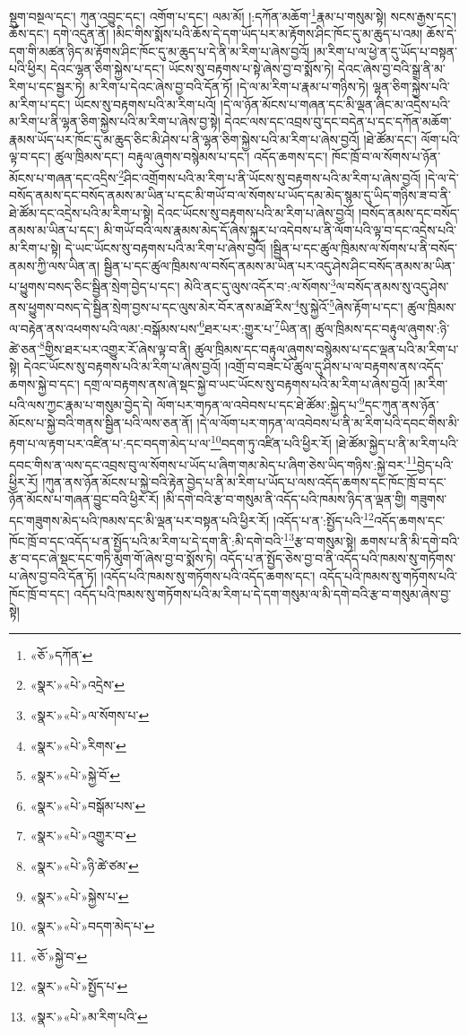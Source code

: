 སྡུག་བསྔལ་དང་། ཀུན་འབྱུང་དང་། འགོག་པ་དང་། ལམ་མོ། །:དཀོན་མཆོག་\footnote{«ཅོ་»དཀོན་}རྣམ་པ་གསུམ་སྟེ། སངས་རྒྱས་དང་། ཆོས་དང་། དགེ་འདུན་ནོ། །མིང་གིས་སྨོས་པའི་ཆོས་དེ་དག་ཡོད་པར་མ་རྟོགས་ཤིང་ཁོང་དུ་མ་ཆུད་པ་འམ། ཆོས་དེ་དག་གི་མཚན་ཉིད་མ་རྟོགས་ཤིང་ཁོང་དུ་མ་ཆུད་པ་དེ་ནི་མ་རིག་པ་ཞེས་བྱའོ། །མ་རིག་པ་ལ་ཕྱེ་ན་དུ་ཡོད་པ་བསྟན་པའི་ཕྱིར། དེའང་ལྷན་ཅིག་སྐྱེས་པ་དང་། ཡོངས་སུ་བརྟགས་པ་སྟེ་ཞེས་བྱ་བ་སྨོས་ཏེ། དེའང་ཞེས་བྱ་བའི་སྒྲ་ནི་མ་རིག་པ་དང་སྦྱར་ཏེ། མ་རིག་པ་དེའང་ཞེས་བྱ་བའི་དོན་ཏོ། །དེ་ལ་མ་རིག་པ་རྣམ་པ་གཉིས་ཏེ། ལྷན་ཅིག་སྐྱེས་པའི་མ་རིག་པ་དང་། ཡོངས་སུ་བརྟགས་པའི་མ་རིག་པའོ། །དེ་ལ་ཉོན་མོངས་པ་གཞན་དང་མི་ལྡན་ཞིང་མ་འདྲེས་པའི་མ་རིག་པ་ནི་ལྷན་ཅིག་སྐྱེས་པའི་མ་རིག་པ་ཞེས་བྱ་སྟེ། དེའང་ལས་དང་འབྲས་བུ་དང་བདེན་པ་དང་དཀོན་མཆོག་རྣམས་ཡོད་པར་ཁོང་དུ་མ་ཆུད་ཅིང་མི་ཤེས་པ་ནི་ལྷན་ཅིག་སྐྱེས་པའི་མ་རིག་པ་ཞེས་བྱའོ། །ཐེ་ཚོམ་དང་། ལོག་པའི་ལྟ་བ་དང་། ཚུལ་ཁྲིམས་དང་། བརྟུལ་ཞུགས་བསྙེམས་པ་དང་། འདོད་ཆགས་དང་། ཁོང་ཁྲོ་བ་ལ་སོགས་པ་ཉོན་མོངས་པ་གཞན་དང་འདྲིས་\footnote{«སྣར་»«པེ་»འདྲེས་}ཤིང་འགྲོགས་པའི་མ་རིག་པ་ནི་ཡོངས་སུ་བརྟགས་པའི་མ་རིག་པ་ཞེས་བྱའོ། །དེ་ལ་དེ་བསོད་ནམས་དང་བསོད་ནམས་མ་ཡིན་པ་དང་མི་གཡོ་བ་ལ་སོགས་པ་ཡོད་དམ་མེད་སྙམ་དུ་ཡིད་གཉིས་ཟ་བ་ནི་ཐེ་ཚོམ་དང་འདྲེས་པའི་མ་རིག་པ་སྟེ། དེའང་ཡོངས་སུ་བརྟགས་པའི་མ་རིག་པ་ཞེས་བྱའོ། །བསོད་ནམས་དང་བསོད་ནམས་མ་ཡིན་པ་དང་། མི་གཡོ་བའི་ལས་རྣམས་མེད་དོ་ཞེས་སྐུར་པ་འདེབས་པ་ནི་ལོག་པའི་ལྟ་བ་དང་འདྲེས་པའི་མ་རིག་པ་སྟེ། དེ་ཡང་ཡོངས་སུ་བརྟགས་པའི་མ་རིག་པ་ཞེས་བྱའོ། །སྦྱིན་པ་དང་ཚུལ་ཁྲིམས་ལ་སོགས་པ་ནི་བསོད་ནམས་ཀྱི་ལས་ཡིན་ན། སྦྱིན་པ་དང་ཚུལ་ཁྲིམས་ལ་བསོད་ནམས་མ་ཡིན་པར་འདུ་ཤེས་ཤིང་བསོད་ནམས་མ་ཡིན་པ་ཕྱུགས་བསད་ཅིང་སྦྱིན་སྲེག་བྱེད་པ་དང་། མེའི་ནང་དུ་ལུས་འདོར་བ་:ལ་སོགས་\footnote{«སྣར་»«པེ་»ལ་སོགས་པ་}ལ་བསོད་ནམས་སུ་འདུ་ཤེས་ནས་ཕྱུགས་བསད་དེ་སྦྱིན་སྲེག་བྱས་པ་དང་ལུས་མེར་བོར་ནས་མཐོ་རིས་\footnote{«སྣར་»«པེ་»རིགས་}སུ་སྐྱེའོ་\footnote{«སྣར་»«པེ་»སྐྱེ་བོ་}ཞེས་རྟོག་པ་དང་། ཚུལ་ཁྲིམས་ལ་བརྟེན་ནས་འཕགས་པའི་ལམ་:བསྒོམས་པས་\footnote{«སྣར་»«པེ་»བསྒོམ་པས་}ཐར་པར་:གྱུར་པ་\footnote{«སྣར་»«པེ་»འགྱུར་བ་}ཡིན་ན། ཚུལ་ཁྲིམས་དང་བརྟུལ་ཞུགས་:ཉི་ཚེ་ཅན་\footnote{«སྣར་»«པེ་»ཉི་ཚེ་ཙམ་}གྱིས་ཐར་པར་འགྱུར་རོ་ཞེས་ལྟ་བ་ནི། ཚུལ་ཁྲིམས་དང་བརྟུལ་ཞུགས་བསྙེམས་པ་དང་ལྡན་པའི་མ་རིག་པ་སྟེ། དེའང་ཡོངས་སུ་བརྟགས་པའི་མ་རིག་པ་ཞེས་བྱའོ། །འགྲོ་བ་བཟང་པོ་ཚུལ་དུ་ཤིས་པ་ལ་བརྟགས་ནས་འདོད་ཆགས་སྐྱེ་བ་དང་། དགྲ་ལ་བརྟགས་ནས་ཞེ་སྡང་སྐྱེ་བ་ཡང་ཡོངས་སུ་བརྟགས་པའི་མ་རིག་པ་ཞེས་བྱའོ། །མ་རིག་པའི་ལས་ཀྱང་རྣམ་པ་གསུམ་བྱེད་དེ། ལོག་པར་གཏན་ལ་འབེབས་པ་དང་ཐེ་ཚོམ་:སྐྱེད་པ་\footnote{«སྣར་»«པེ་»སྐྱེས་པ་}དང་ཀུན་ནས་ཉོན་མོངས་པ་སྐྱེ་བའི་གནས་སྦྱིན་པའི་ལས་ཅན་ནོ། །དེ་ལ་ལོག་པར་གཏན་ལ་འབེབས་པ་ནི་མ་རིག་པའི་དབང་གིས་མི་རྟག་པ་ལ་རྟག་པར་འཛིན་པ་:དང་བདག་མེད་པ་ལ་\footnote{«སྣར་»«པེ་»བདག་མེད་པ་}བདག་ཏུ་འཛིན་པའི་ཕྱིར་རོ། །ཐེ་ཚོམ་སྐྱེད་པ་ནི་མ་རིག་པའི་དབང་གིས་ན་ལས་དང་འབྲས་བུ་ལ་སོགས་པ་ཡོད་པ་ཞིག་གམ་མེད་པ་ཞིག་ཅེས་ཡིད་གཉིས་:སྐྱེ་བར་\footnote{«ཅོ་»སྐྱེ་བ་}བྱེད་པའི་ཕྱིར་རོ། །ཀུན་ནས་ཉོན་མོངས་པ་སྐྱེ་བའི་རྟེན་བྱེད་པ་ནི་མ་རིག་པ་ཡོད་པ་ལས་འདོད་ཆགས་དང་ཁོང་ཁྲོ་བ་དང་ཉོན་མོངས་པ་གཞན་བྱུང་བའི་ཕྱིར་རོ། །མི་དགེ་བའི་རྩ་བ་གསུམ་ནི་འདོད་པའི་ཁམས་ཉིད་ན་ལྡན་གྱི། གཟུགས་དང་གཟུགས་མེད་པའི་ཁམས་དང་མི་ལྡན་པར་བསྟན་པའི་ཕྱིར་རོ། །འདོད་པ་ན་:སྤྱོད་པའི་\footnote{«སྣར་»«པེ་»སྤྱོད་པ་}འདོད་ཆགས་དང་ཁོང་ཁྲོ་བ་དང་འདོད་པ་ན་སྤྱོད་པའི་མ་རིག་པ་དེ་དག་ནི་:མི་དགེ་བའི་\footnote{«སྣར་»«པེ་»མ་རིག་པའི་}རྩ་བ་གསུམ་སྟེ། ཆགས་པ་ནི་མི་དགེ་བའི་རྩ་བ་དང་ཞེ་སྡང་དང་གཏི་མུག་གོ་ཞེས་བྱ་བ་སྨོས་ཏེ། འདོད་པ་ན་སྤྱོད་ཅེས་བྱ་བ་ནི་འདོད་པའི་ཁམས་སུ་གཏོགས་པ་ཞེས་བྱ་བའི་དོན་ཏོ། །འདོད་པའི་ཁམས་སུ་གཏོགས་པའི་འདོད་ཆགས་དང་། འདོད་པའི་ཁམས་སུ་གཏོགས་པའི་ཁོང་ཁྲོ་བ་དང་། འདོད་པའི་ཁམས་སུ་གཏོགས་པའི་མ་རིག་པ་དེ་དག་གསུམ་ལ་མི་དགེ་བའི་རྩ་བ་གསུམ་ཞེས་བྱ་སྟེ། 